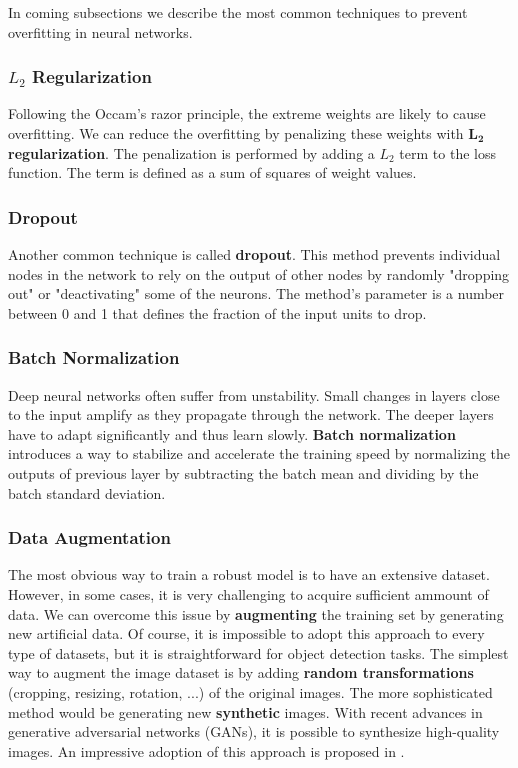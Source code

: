 In coming subsections we describe the most common techniques to prevent
overfitting in neural networks.
\subsubsection{$L_2$ Regularization}
Following the Occam's razor principle\footnotemark , the extreme weights are
likely to cause overfitting. We can reduce the overfitting by penalizing these
weights with $\boldsymbol{L_2}$ \textbf{regularization}. The penalization is
performed by adding a $L_2$ term to the loss function. The term is defined as a
sum of squares of weight values.

\subsubsection{Dropout}
Another common technique is called \textbf{dropout}. This method prevents
individual nodes in the network to rely on the output of other nodes by randomly
"dropping out" or "deactivating" some of the neurons. The method's parameter is
a number between 0 and 1 that defines the fraction of the input units to drop.

\subsubsection{Batch Normalization}
Deep neural networks often suffer from unstability. Small changes in layers
close to the input amplify as they propagate through the network. The deeper
layers have to adapt significantly and thus learn slowly.
\textbf{Batch normalization} introduces a way to stabilize and accelerate the
training speed by normalizing the outputs of previous layer by subtracting the
batch mean and dividing by the batch standard deviation.

\subsubsection{Data Augmentation}
The most obvious way to train a robust model is to have an extensive dataset.
However, in some cases, it is very challenging to acquire sufficient ammount of
data. We can overcome this issue by
\textbf{augmenting} the training set by generating new artificial data. Of
course, it is impossible to adopt this approach to every type of datasets, but
it is straightforward for object detection tasks. The simplest way to augment
the image dataset is by adding \textbf{random transformations} (cropping,
resizing, rotation, ...) of the original images. The more sophisticated method
would be generating new \textbf{synthetic} images. With recent advances in
generative adversarial networks (GANs), it is possible to synthesize
high-quality images. An impressive adoption of this approach is proposed in
\cite{wei2019generative}.